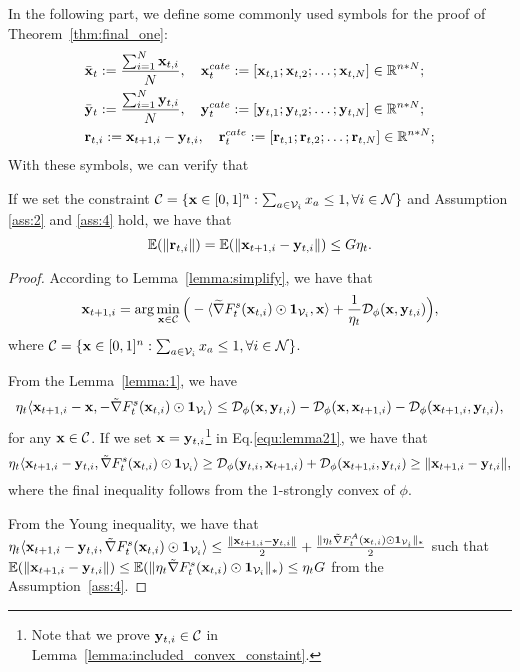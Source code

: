 In the following part, we define some commonly used symbols for the proof of Theorem~\ref{thm:final_one}: 
	\begin{equation*}
		\begin{aligned}
			&\bar{\x}_{t}:=\frac{\sum_{i=1}^{N}\x_{t,i}}{N},\ \ \ \x_{t}^{cate}:=[\x_{t,1};\x_{t,2};\dots;\x_{t,N}]\in\R^{n*N};\\
			&\bar{\y}_{t}:=\frac{\sum_{i=1}^{N}\y_{t,i}}{N},\ \ \ \y_{t}^{cate}:=[\y_{t,1};\y_{t,2};\dots;\y_{t,N}]\in\R^{n*N};\\
			&\mathbf{r}_{t,i}:=\x_{t+1,i}-\y_{t,i},\ \ \ \mathbf{r}_{t}^{cate}:=[\mathbf{r}_{t,1};\mathbf{r}_{t,2};\dots;\mathbf{r}_{t,N}]\in\R^{n*N};
		\end{aligned}
	\end{equation*}
With these symbols, we can verify that 
	\begin{lemma}\label{lemma:2} If we set the constraint $\mathcal{C}=\{\mathbf{x}\in[0,1]^{n}: \sum_{a\in\mathcal{V}_{i}}x_{a}\le1,\forall i\in\mathcal{N}\}$ and Assumption \ref{ass:2} and \ref{ass:4} hold, we have that
		\begin{equation*}
			\mathbb{E}(\|\mathbf{r}_{t,i}\|)=\mathbb{E}(\|\mathbf{x}_{t+1,i}-\mathbf{y}_{t,i}\|)\le G\eta_{t}.
		\end{equation*}
	\end{lemma}
	\begin{proof}
		According to Lemma~\ref{lemma:simplify}, we have that 
		\begin{equation*}
			\mathbf{x}_{t+1,i}=\mathop{\arg\min_{\mathbf{x}\in\mathcal{C}}}\Big(-\langle\widetilde{\nabla} F_{t}^{s}(\mathbf{x}_{t,i})\odot\mathbf{1}_{\mathcal{V}_{i}},\mathbf{x}\rangle+\frac{1}{\eta_{t}}\mathcal{D}_{\phi}(\mathbf{x}, \mathbf{y}_{t,i})\Big),
		\end{equation*} where $\mathcal{C}=\{\mathbf{x}\in[0,1]^{n}: \sum_{a\in\mathcal{V}_{i}}x_{a}\le1,\forall i\in\mathcal{N}\}$.  
		
		From the Lemma~\ref{lemma:1}, we have
		\begin{equation}\label{equ:lemma21}
			\eta_{t}\langle	\mathbf{x}_{t+1,i}-\mathbf{x},-\tilde{\nabla} F_{t}^{s}(\mathbf{x}_{t,i})\odot\mathbf{1}_{\mathcal{V}_{i}}\rangle\le \mathcal{D}_{\phi}(\mathbf{x},\mathbf{y}_{t,i})-\mathcal{D}_{\phi}(\mathbf{x},\mathbf{x}_{t+1,i})-\mathcal{D}_{\phi}(\mathbf{x}_{t+1,i},\mathbf{y}_{t,i}),
		\end{equation} for any $\mathbf{x}\in\mathcal{C}$.
		If we set $\mathbf{x}=\mathbf{y}_{t,i}$\footnote{Note that we prove $\mathbf{y}_{t,i}\in\mathcal{C}$ in Lemma~\ref{lemma:included_convex_constaint}.} in Eq.\eqref{equ:lemma21}, we have that
		\begin{equation*}
			\eta_{t}\langle	\mathbf{x}_{t+1,i}-\mathbf{y}_{t,i},\tilde{\nabla} F_{t}^{s}(\mathbf{x}_{t,i})\odot\mathbf{1}_{\mathcal{V}_{i}}\rangle\ge\mathcal{D}_{\phi}(\mathbf{y}_{t,i},\mathbf{x}_{t+1,i})+\mathcal{D}_{\phi}(\mathbf{x}_{t+1,i},\mathbf{y}_{t,i})\ge\|\mathbf{x}_{t+1,i}-\mathbf{y}_{t,i}\|,
		\end{equation*} where the final inequality follows from the $1$-strongly convex of $\phi$.
		
		From the Young inequality, we have that $\eta_{t}\langle	\mathbf{x}_{t+1,i}-\mathbf{y}_{t,i},\tilde{\nabla} F_{t}^{s}(\mathbf{x}_{t,i})\odot\mathbf{1}_{\mathcal{V}_{i}}\rangle\le\frac{\|\mathbf{x}_{t+1,i}-\mathbf{y}_{t,i}\|}{2}+\frac{\|\eta_{t}\tilde{\nabla} F_{t}^{A}(\mathbf{x}_{t,i})\odot\mathbf{1}_{\mathcal{V}_{i}}\|_{*}}{2}$ such that $\mathbb{E}(\|\mathbf{x}_{t+1,i}-\mathbf{y}_{t,i}\|)\le\mathbb{E}(\|\eta_{t}\tilde{\nabla}F_{t}^{s}(\mathbf{x}_{t,i})\odot\mathbf{1}_{\mathcal{V}_{i}}\|_{*})\le\eta_{t}G$ from the Assumption~\ref{ass:4}.
			\end{proof}
